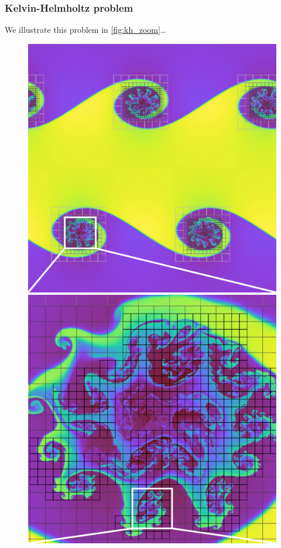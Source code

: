 \documentclass[fleqn,usenatbib]{mnras}
\begin{document}
\subsubsection{Kelvin-Helmholtz problem}
We illustrate this problem in \autoref{fig:kh_zoom}\dots
\begin{figure}
    \includegraphics[width=0.9\columnwidth]{quokka_full.pdf}
    \includegraphics[width=0.9\columnwidth]{quokka_zoom.pdf}

\end{figure}
\end{document}
